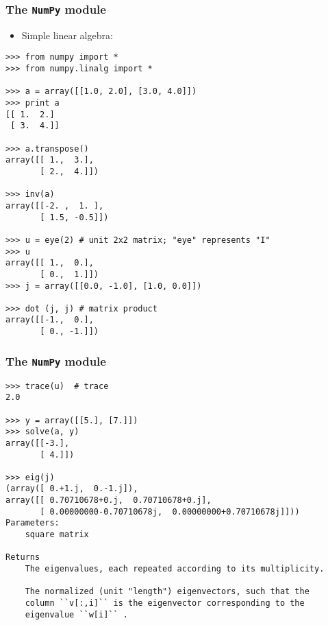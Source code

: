 \documentclass[handout]{beamer}
\numberwithin{equation}{section}
\begin{document}
\begin{frame}[fragile]
\frametitle{The {\tt NumPy} module}

\begin{itemize}
\item Simple linear algebra:
\end{itemize}

\begin{lstlisting}[name=ex2]
>>> from numpy import *
>>> from numpy.linalg import *

>>> a = array([[1.0, 2.0], [3.0, 4.0]])
>>> print a
[[ 1.  2.]
 [ 3.  4.]]

>>> a.transpose()
array([[ 1.,  3.],
       [ 2.,  4.]])

>>> inv(a)
array([[-2. ,  1. ],
       [ 1.5, -0.5]])

>>> u = eye(2) # unit 2x2 matrix; "eye" represents "I"
>>> u
array([[ 1.,  0.],
       [ 0.,  1.]])
>>> j = array([[0.0, -1.0], [1.0, 0.0]])

>>> dot (j, j) # matrix product
array([[-1.,  0.],
       [ 0., -1.]])
\end{lstlisting}
\end{frame}

\begin{frame}[fragile]
\frametitle{The {\tt NumPy} module}

\begin{lstlisting}[name=ex2]
>>> trace(u)  # trace
2.0

>>> y = array([[5.], [7.]])
>>> solve(a, y)
array([[-3.],
       [ 4.]])

>>> eig(j)
(array([ 0.+1.j,  0.-1.j]),
array([[ 0.70710678+0.j,  0.70710678+0.j],
       [ 0.00000000-0.70710678j,  0.00000000+0.70710678j]]))
Parameters:
    square matrix

Returns
    The eigenvalues, each repeated according to its multiplicity.

    The normalized (unit "length") eigenvectors, such that the
    column ``v[:,i]`` is the eigenvector corresponding to the
    eigenvalue ``w[i]`` .
\end{lstlisting}
\end{frame}
\end{document}
